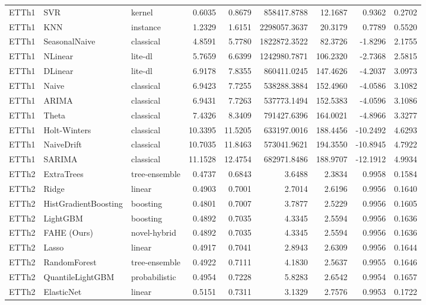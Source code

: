 \begin{tabular}{lllrrrrrr}
ETTh1 & SVR & kernel & 0.6035 & 0.8679 & 858417.8788 & 12.1687 & 0.9362 & 0.2702 \\
ETTh1 & KNN & instance & 1.2329 & 1.6151 & 2298057.3637 & 20.3179 & 0.7789 & 0.5520 \\
ETTh1 & SeasonalNaive & classical & 4.8591 & 5.7780 & 1822872.3522 & 82.3726 & -1.8296 & 2.1755 \\
ETTh1 & NLinear & lite-dl & 5.7659 & 6.6399 & 1242980.7871 & 106.2320 & -2.7368 & 2.5815 \\
ETTh1 & DLinear & lite-dl & 6.9178 & 7.8355 & 860411.0245 & 147.4626 & -4.2037 & 3.0973 \\
ETTh1 & Naive & classical & 6.9423 & 7.7255 & 538288.3884 & 152.4960 & -4.0586 & 3.1082 \\
ETTh1 & ARIMA & classical & 6.9431 & 7.7263 & 537773.1494 & 152.5383 & -4.0596 & 3.1086 \\
ETTh1 & Theta & classical & 7.4326 & 8.3409 & 791427.6396 & 164.0021 & -4.8966 & 3.3277 \\
ETTh1 & Holt-Winters & classical & 10.3395 & 11.5205 & 633197.0016 & 188.4456 & -10.2492 & 4.6293 \\
ETTh1 & NaiveDrift & classical & 10.7035 & 11.8463 & 573041.9621 & 194.3550 & -10.8945 & 4.7922 \\
ETTh1 & SARIMA & classical & 11.1528 & 12.4754 & 682971.8486 & 188.9707 & -12.1912 & 4.9934 \\
ETTh2 & ExtraTrees & tree-ensemble & 0.4737 & 0.6843 & 3.6488 & 2.3834 & 0.9958 & 0.1584 \\
ETTh2 & Ridge & linear & 0.4903 & 0.7001 & 2.7014 & 2.6196 & 0.9956 & 0.1640 \\
ETTh2 & HistGradientBoosting & boosting & 0.4801 & 0.7007 & 3.7877 & 2.5229 & 0.9956 & 0.1605 \\
ETTh2 & LightGBM & boosting & 0.4892 & 0.7035 & 4.3345 & 2.5594 & 0.9956 & 0.1636 \\
ETTh2 & FAHE (Ours) & novel-hybrid & 0.4892 & 0.7035 & 4.3345 & 2.5594 & 0.9956 & 0.1636 \\
ETTh2 & Lasso & linear & 0.4917 & 0.7041 & 2.8943 & 2.6309 & 0.9956 & 0.1644 \\
ETTh2 & RandomForest & tree-ensemble & 0.4922 & 0.7111 & 4.1830 & 2.5637 & 0.9955 & 0.1646 \\
ETTh2 & QuantileLightGBM & probabilistic & 0.4954 & 0.7228 & 5.8283 & 2.6542 & 0.9954 & 0.1657 \\
ETTh2 & ElasticNet & linear & 0.5151 & 0.7311 & 3.1329 & 2.7576 & 0.9953 & 0.1722 \\

\end{tabular}
